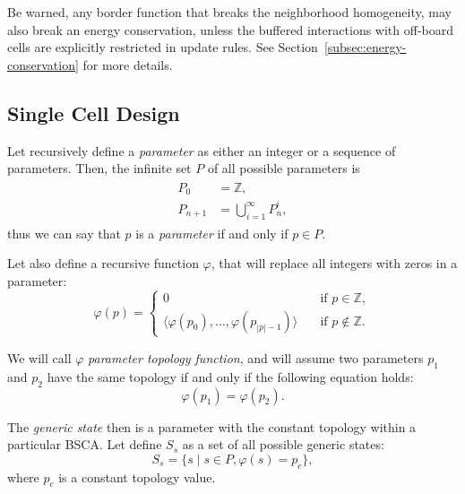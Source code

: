 \documentclass[a4paper,12pt,tikz,UTF8]{article}
\begin{document}
    Be warned, any border function that breaks the neighborhood homogeneity, may also break an energy conservation, unless the buffered interactions with off-board cells are explicitly restricted in update rules. See Section~\ref{subsec:energy-conservation} for more details.

  \subsection{Single Cell Design}

    Let recursively define a \textit{parameter} as either an integer or a sequence of parameters. Then, the infinite set $P$ of all possible parameters is
    \begin{align}
      \begin{split}
        P_0 &= \mathbb{Z},\\
        P_{n + 1} &= \bigcup_{i=1}^\infty{P_n^i,}
      \end{split}
    \end{align}
    thus we can say that $p$ is a \textit{parameter} if and only if $p \in P$.

    Let also define a recursive function $\varphi$, that will replace all integers with zeros in a parameter:
    \begin{equation}
      \varphi(p) = 
      \begin{cases}
        0 \quad & \text{if } p \in \mathbb{Z},\\
        \langle \varphi(p_0), ..., \varphi(p_{|p|-1}) \rangle \quad & \text{if } p \notin \mathbb{Z}.
      \end{cases}
    \end{equation}

    We will call $\varphi$ \textit{parameter topology function}, and will assume two parameters $p_1$ and $p_2$ have the same topology if and only if the following equation holds:
    \begin{equation}
      \varphi(p_1) = \varphi(p_2).
    \end{equation}

    The \textit{generic state} then is a parameter with the constant topology within a particular BSCA. Let define $S_s$ as a set of all possible generic states:
    \begin{equation}
      S_s = \{ s \mid s \in P, \varphi(s) = p_c \},
    \end{equation}
    where $p_c$ is a constant topology value.
\end{document}
